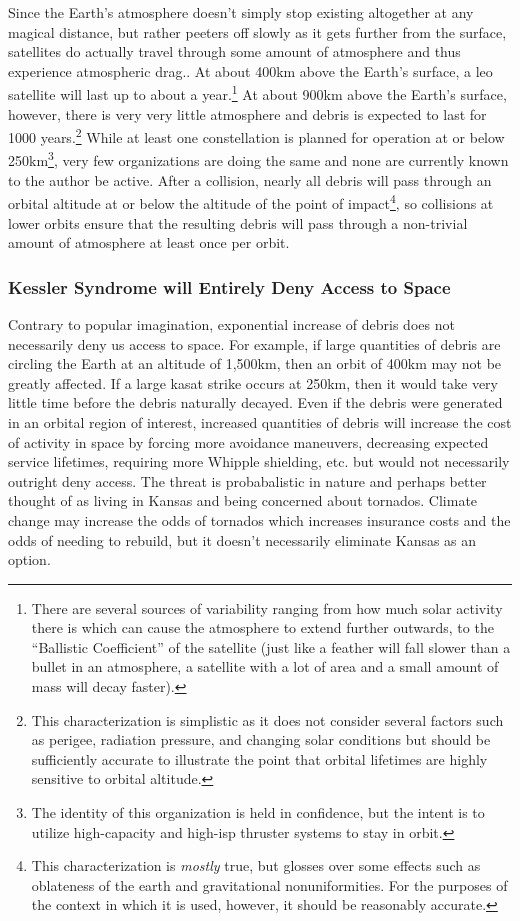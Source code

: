 Since the Earth's atmosphere doesn't simply stop existing altogether
at any magical distance, but rather peeters off slowly as it gets
further from the surface, satellites do actually travel through some
amount of atmosphere and thus experience atmospheric
drag.\cite{hello-decay}.  At about 400km above the Earth's surface, a
\ac{leo} satellite will last up to about a year.\footnote{There are
several sources of variability ranging from how much solar activity
there is which can cause the atmosphere to extend further outwards, to
the ``Ballistic Coefficient'' of the satellite (just like a feather
will fall slower than a bullet in an atmosphere, a satellite with a
lot of area and a small amount of mass will decay
faster).}\cite{hello-decay} At about 900km above the Earth's surface,
however, there is very very little atmosphere and debris is expected
to last for 1000 years.\footnote{This characterization is simplistic
as it does not consider several factors such as perigee, radiation
pressure, and changing solar conditions but should be sufficiently
accurate to illustrate the point that orbital lifetimes are highly
sensitive to orbital altitude.}\cite{hello-decay} While at least one
constellation is planned for operation at or below 250km\footnote{The
identity of this organization is held in confidence, but the intent is
to utilize high-capacity and high-isp thruster systems to stay in
orbit.}, very few organizations are doing the same and none are
currently known to the author be active.  After a collision, nearly
all debris will pass through an orbital altitude at or below the
altitude of the point of impact\footnote{This characterization is
\emph{mostly} true, but glosses over some effects such as oblateness
of the earth and gravitational nonuniformities.  For the purposes of
the context in which it is used, however, it should be reasonably
accurate.}, so collisions at lower orbits ensure that the resulting
debris will pass through a non-trivial amount of atmosphere at least
once per orbit.

\subsubsection{Kessler Syndrome will Entirely Deny Access to Space}
Contrary to popular imagination, exponential increase of debris does
not necessarily deny us access to space.  For example, if large
quantities of debris are circling the Earth at an altitude of 1,500km,
then an orbit of 400km may not be greatly affected.  If a large
\ac{kasat} strike occurs at 250km, then it would take very little time
before the debris naturally decayed.  Even if the debris were
generated in an orbital region of interest, increased quantities of
debris will increase the cost of activity in space by forcing more
avoidance maneuvers, decreasing expected service lifetimes, requiring
more Whipple shielding, etc. but would not necessarily outright deny
access.  The threat is probabalistic in nature and perhaps better
thought of as living in Kansas and being concerned about tornados.
Climate change may increase the odds of tornados which increases
insurance costs and the odds of needing to rebuild, but it doesn't
necessarily eliminate Kansas as an option.

